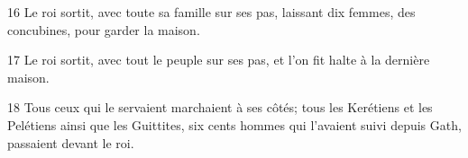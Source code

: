
16 Le roi sortit, avec toute sa famille sur ses pas, laissant dix femmes, des concubines, pour garder la maison.

17 Le roi sortit, avec tout le peuple sur ses pas, et l’on fit halte à la dernière maison.

18 Tous ceux qui le servaient marchaient à ses côtés; tous les Kerétiens et les Pelétiens ainsi que les Guittites, six cents hommes qui l’avaient suivi depuis Gath, passaient devant le roi.
